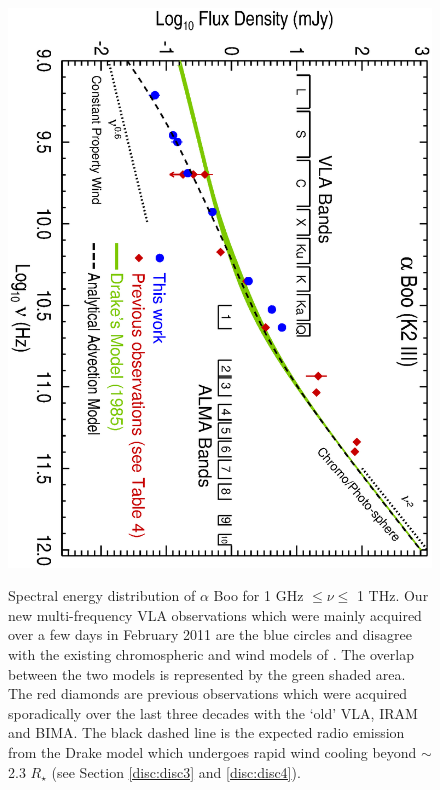 \documentclass[iop]{emulateapj}
\begin{document}
\begin{figure}
\centering
\includegraphics[trim = 0mm 0mm 0mm 20mm, clip,scale=0.65, angle=90]{fig1.ps}
\\
\caption{Spectral energy distribution of $\alpha$ Boo for 1 GHz $\leq \nu \leq$ 1 THz. Our new multi-frequency VLA observations which were mainly acquired over a few days in February 2011 are the blue circles and disagree with the existing chromospheric and wind models of \cite{1985pssl.proc..351D}. The overlap between the two models is represented by the green shaded area. The red diamonds are previous observations which were acquired sporadically over the last three decades with the `old' VLA, IRAM and BIMA. The black dashed line is the expected radio emission from the Drake model which undergoes rapid wind cooling beyond $\sim$2.3 $R_{\star}$ (see Section \ref{disc:disc3} and \ref{disc:disc4}).}
\label{fig:fig1}
\centering

\end{figure}
\end{document}
